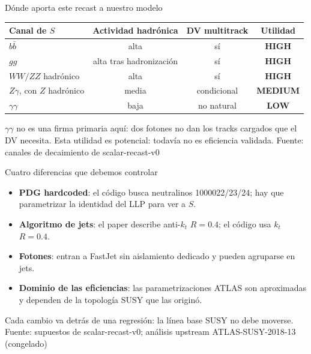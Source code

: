 \documentclass[aspectratio=169,10pt]{beamer}
\newcommand{\source}[1]{\vfill{\tiny\color{gray}Fuente: #1}}
\newcommand{\upcode}{análisis upstream ATLAS-SUSY-2018-13 (congelado)}
\begin{document}
\begin{frame}{Dónde aporta este recast a nuestro modelo}
  \vspace{0.3em}
  \begin{tabular}{lccc}
    \toprule
    Canal de $S$ & Actividad hadrónica & DV multitrack & Utilidad\\
    \midrule
    $b\bar b$ & alta & sí & \textbf{HIGH}\\
    $gg$ & alta tras hadronización & sí & \textbf{HIGH}\\
    $WW/ZZ$ hadrónico & alta & sí & \textbf{HIGH}\\
    $Z\gamma$, con $Z$ hadrónico & media & condicional & \textbf{MEDIUM}\\
    $\gamma\gamma$ & baja & no natural & \textbf{LOW}\\
    \bottomrule
  \end{tabular}
  \vspace{0.9em}

  $\gamma\gamma$ no es una firma primaria aquí: dos fotones no dan los tracks cargados
  que el DV necesita. Esta utilidad es potencial: todavía no es eficiencia validada.
  \source{canales de decaimiento de scalar-recast-v0}
\end{frame}

\begin{frame}{Cuatro diferencias que debemos controlar}
  \begin{itemize}
    \item \textbf{PDG hardcoded}: el código busca neutralinos 1000022/23/24;
          hay que parametrizar la identidad del LLP para ver a $S$.
    \item \textbf{Algoritmo de jets}: el paper describe anti-$k_t$ $R=0.4$;
          el código usa $k_t$ $R=0.4$.
    \item \textbf{Fotones}: entran a FastJet sin aislamiento dedicado y pueden
          agruparse en jets.
    \item \textbf{Dominio de las eficiencias}: las parametrizaciones ATLAS son
          aproximadas y dependen de la topología SUSY que las originó.
  \end{itemize}
  \vspace{0.8em}
  \centering
  Cada cambio va detrás de una regresión: la línea base SUSY no debe moverse.
  \source{supuestos de scalar-recast-v0; \upcode}
\end{frame}
\end{document}
